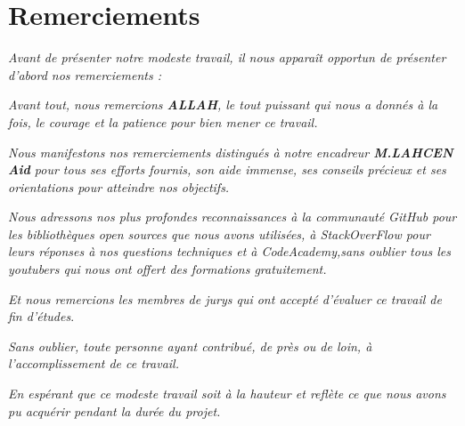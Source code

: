 \chapter*{Remerciements}
 \large

\textit{	Avant de présenter notre modeste travail, il nous apparaît opportun de présenter d’abord nos remerciements : }
 
\textit{Avant tout, nous remercions \textbf{ALLAH}, le tout puissant qui nous a donnés à la fois, le courage et la patience pour bien mener ce travail.}
 
 
\textit{	Nous manifestons nos remerciements distingués à notre encadreur \textbf{M.LAHCEN Aid} pour tous ses efforts fournis, son aide immense, ses conseils précieux et ses orientations pour atteindre nos objectifs. }


\textit{Nous adressons nos plus profondes reconnaissances à la communauté GitHub pour les bibliothèques open sources que nous avons utilisées, à StackOverFlow pour leurs réponses à nos questions techniques et à CodeAcademy,sans oublier tous les  youtubers qui nous ont offert des formations  gratuitement. 
}

\textit{Et nous remercions les membres de jurys qui ont accepté d’évaluer ce travail de fin d’études}. 


\textit{Sans oublier, toute personne ayant contribué, de près ou de loin, à l’accomplissement de ce travail.  }


\textit{En espérant que ce modeste travail soit à la hauteur et reflète ce que nous avons pu acquérir pendant la durée du projet. }
 
\normalsize

